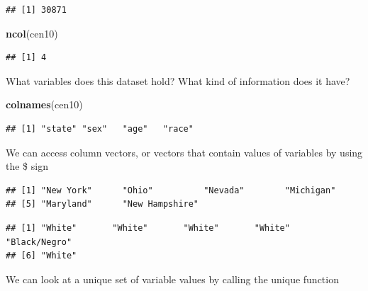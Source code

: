 \documentclass[]{book}
\newenvironment{Shaded}{\begin{snugshade}}{\end{snugshade}}
\newcommand{\KeywordTok}[1]{\textcolor[rgb]{0.13,0.29,0.53}{\textbf{#1}}}
\newcommand{\OperatorTok}[1]{\textcolor[rgb]{0.81,0.36,0.00}{\textbf{#1}}}
\newcommand{\NormalTok}[1]{#1}
\theoremstyle{definition}
\theoremstyle{definition}
\theoremstyle{definition}
\theoremstyle{remark}
\begin{document}
\begin{verbatim}
## [1] 30871
\end{verbatim}

\begin{Shaded}
\begin{Highlighting}[]
\KeywordTok{ncol}\NormalTok{(cen10)}
\end{Highlighting}
\end{Shaded}

\begin{verbatim}
## [1] 4
\end{verbatim}

What variables does this dataset hold? What kind of information does it
have?

\begin{Shaded}
\begin{Highlighting}[]
\KeywordTok{colnames}\NormalTok{(cen10)}
\end{Highlighting}
\end{Shaded}

\begin{verbatim}
## [1] "state" "sex"   "age"   "race"
\end{verbatim}

We can access column vectors, or vectors that contain values of
variables by using the \$ sign

\begin{Shaded}
\end{Shaded}

\begin{verbatim}
## [1] "New York"      "Ohio"          "Nevada"        "Michigan"     
## [5] "Maryland"      "New Hampshire"
\end{verbatim}

\begin{Shaded}
\end{Shaded}

\begin{verbatim}
## [1] "White"       "White"       "White"       "White"       "Black/Negro"
## [6] "White"
\end{verbatim}

We can look at a unique set of variable values by calling the unique
function
\end{document}
